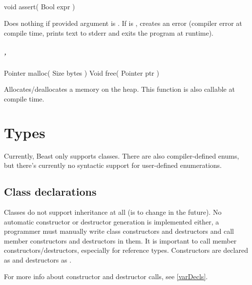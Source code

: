 \paragraph{}

\begin{code}
void assert( Bool expr )
\end{code}
Does nothing if provided argument is . If  is , creates an error (compiler error at compile time, prints text to stderr and exits the program at runtime).

\paragraph{, }

\begin{code}
	Pointer malloc( Size bytes )
	Void free( Pointer ptr )
\end{code}
Allocates/deallocates a memory on the heap. This function is also callable at compile time.

\chapter{Types}

\begin{grammar}
	   \kwd{\{}  \kwd{\}}
\end{grammar}

Currently, Beast only supports classes. There are also compiler-defined enums, but there's currently no syntactic support for user-defined enumerations.

\section{Class declarations}
Classes do not support inheritance at all (is to change in the future). No automatic constructor or destructor generation is implemented either, a programmer must manually write class constructors and destructors and call member constructors and destructors in them. It is important to call member constructors/destructors, especially for reference types. Constructors are declared as  and destructors as .

For more info about constructor and destructor calls, see \autoref{varDecls}.

